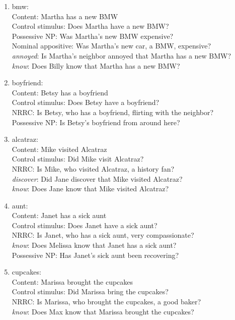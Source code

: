 \documentclass[11pt,fleqn]{article}
\newcommand{\6}{\mbox{$[\hspace*{-.6mm}[$}}
\newcommand{\9}{\mbox{$]\hspace*{-.6mm}]$}}
\begin{document}
\begin{enumerate}
\item bmw:  \\
     Content: Martha has a new BMW\\
     Control stimulus: Does Martha have a new BMW?\\
     Possessive NP: Was Martha's new BMW expensive?\\
     Nominal appositive: Was Martha's new car, a BMW, expensive?\\
     {\em annoyed}: Is Martha's neighbor annoyed that Martha has a new BMW?\\
     {\em know}: Does Billy know that Martha has a new BMW?

\item boyfriend:  \\
     Content: Betsy has a boyfriend\\
     Control stimulus: Does Betsy have a boyfriend?\\
     NRRC: Is Betsy, who has a boyfriend, flirting with the neighbor?\\
     Possessive NP: Is Betsy's boyfriend from around here?

\item alcatraz:  \\
     Content: Mike visited Alcatraz\\
     Control stimulus: Did Mike visit Alcatraz?\\
     NRRC: Is Mike, who visited Alcatraz, a history fan?\\
     {\em discover}: Did Jane discover that Mike visited Alcatraz?\\
     {\em know}: Does Jane know that Mike visited Alcatraz?

\item aunt:  \\
     Content: Janet has a sick aunt\\
     Control stimulus: Does Janet have a sick aunt?\\
     NRRC: Is Janet, who has a sick aunt, very compassionate?\\
     {\em know}: Does Melissa know that Janet has a sick aunt?\\
     Possessive NP: Has Janet's sick aunt been recovering?

\item cupcakes:  \\
     Content: Marissa brought the cupcakes\\
     Control stimulus: Did Marissa bring the cupcakes?\\
     NRRC: Is Marissa, who brought the cupcakes, a good baker?\\
     {\em know}: Does Max know that Marissa brought the cupcakes?


\end{enumerate}
\end{document}
